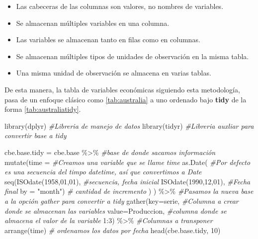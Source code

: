 \documentclass[
  spanish,
]{book}
\newenvironment{Shaded}{\begin{snugshade}}{\end{snugshade}}
\newcommand{\AttributeTok}[1]{\textcolor[rgb]{0.77,0.63,0.00}{#1}}
\newcommand{\CommentTok}[1]{\textcolor[rgb]{0.56,0.35,0.01}{\textit{#1}}}
\newcommand{\DecValTok}[1]{\textcolor[rgb]{0.00,0.00,0.81}{#1}}
\newcommand{\FunctionTok}[1]{\textcolor[rgb]{0.00,0.00,0.00}{#1}}
\newcommand{\NormalTok}[1]{#1}
\newcommand{\OtherTok}[1]{\textcolor[rgb]{0.56,0.35,0.01}{#1}}
\newcommand{\SpecialCharTok}[1]{\textcolor[rgb]{0.00,0.00,0.00}{#1}}
\newcommand{\StringTok}[1]{\textcolor[rgb]{0.31,0.60,0.02}{#1}}
\providecommand{\tightlist}{%
  \setlength{\itemsep}{0pt}\setlength{\parskip}{0pt}}
\theoremstyle{remark}
\begin{document}
\begin{itemize}
\tightlist
\item
  Las cabeceras de las columnas son valores, no nombres de variables.
\item
  Se almacenan múltiples variables en una columna.
\item
  Las variables se almacenan tanto en filas como en columnas.
\item
  Se almacenan múltiples tipos de unidades de observación en la misma tabla.
\item
  Una misma unidad de observación se almacena en varias tablas.
\end{itemize}

De esta manera, la tabla de variables económicas siguiendo esta metodología, pasa de un enfoque clásico como \ref{tab:australia} a uno ordenado bajo \textbf{tidy} de la forma \ref{tab:australiatidy}.

\begin{Shaded}
\begin{Highlighting}[]
\FunctionTok{library}\NormalTok{(dplyr) }\CommentTok{\#Libreria de manejo de datos}
\FunctionTok{library}\NormalTok{(tidyr) }\CommentTok{\#Libreria auxliar para convertir base a tidy}

\NormalTok{cbe.base.tidy }\OtherTok{=}\NormalTok{ cbe.base }\SpecialCharTok{\%\textgreater{}\%}  \CommentTok{\#base de donde sacamos información}
  \FunctionTok{mutate}\NormalTok{(}\AttributeTok{time =}      \CommentTok{\#Creamos una variable que se llame time}
           \FunctionTok{as.Date}\NormalTok{(  }\CommentTok{\#Por defecto es una secuencia del timpo datetime, así que convertimos a Date}
                \FunctionTok{seq}\NormalTok{(}\FunctionTok{ISOdate}\NormalTok{(}\DecValTok{1958}\NormalTok{,}\DecValTok{01}\NormalTok{,}\DecValTok{01}\NormalTok{),  }\CommentTok{\#secuencia, fecha inicial}
                \FunctionTok{ISOdate}\NormalTok{(}\DecValTok{1990}\NormalTok{,}\DecValTok{12}\NormalTok{,}\DecValTok{01}\NormalTok{),  }\CommentTok{\#Fecha final }
                \AttributeTok{by =} \StringTok{"month"}\NormalTok{) }\CommentTok{\# cantidad de incremento}
\NormalTok{                )  }
\NormalTok{         ) }\SpecialCharTok{\%\textgreater{}\%} \CommentTok{\#Pasamos la \textquotesingle{}nueva base\textquotesingle{} a la opción gather para convertir a tidy}
  \FunctionTok{gather}\NormalTok{(}\AttributeTok{key=}\StringTok{\textquotesingle{}serie\textquotesingle{}}\NormalTok{,  }\CommentTok{\#Columna a crear donde se almacenan las variables}
         \AttributeTok{value=}\StringTok{\textquotesingle{}Produccion\textquotesingle{}}\NormalTok{, }\CommentTok{\#columna donde se almacena el valor de la variable }
         \DecValTok{1}\SpecialCharTok{:}\DecValTok{3}\NormalTok{) }\SpecialCharTok{\%\textgreater{}\%} \CommentTok{\#Columnas a transponer}
  \FunctionTok{arrange}\NormalTok{(time)  }\CommentTok{\# ordenamos los datos por fecha}
\FunctionTok{head}\NormalTok{(cbe.base.tidy, }\DecValTok{10}\NormalTok{)}
\end{Highlighting}
\end{Shaded}
\end{document}

